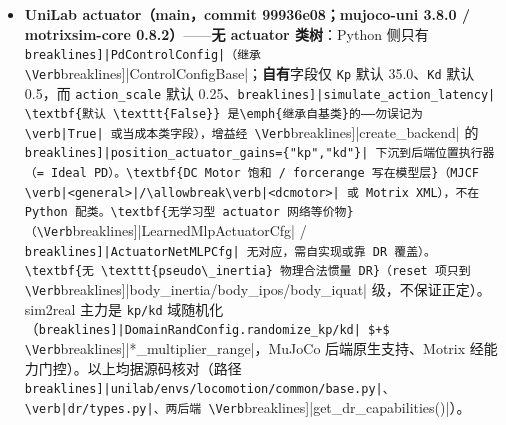 \begin{itemize}
  \item \textbf{UniLab actuator（main，commit 99936e08；mujoco-uni 3.8.0 / motrixsim-core 0.8.2）}——\textbf{无 actuator 类树}：Python 侧只有 \Verb[breaklines]|PdControlConfig|（继承 \Verb[breaklines]|ControlConfigBase|；\textbf{自有}字段仅 \verb|Kp| 默认 35.0、\verb|Kd| 默认 0.5，而 \verb|action_scale| 默认 0.25、\Verb[breaklines]|simulate_action_latency| \textbf{默认 \texttt{False}} 是\emph{继承自基类}的——勿误记为 \verb|True| 或当成本类字段），增益经 \Verb[breaklines]|create_backend| 的 \Verb[breaklines]|position_actuator_gains={"kp","kd"}| 下沉到后端位置执行器（= Ideal PD）。\textbf{DC Motor 饱和 / forcerange 写在模型层}（MJCF \verb|<general>|/\allowbreak\verb|<dcmotor>| 或 Motrix XML），不在 Python 配类。\textbf{无学习型 actuator 网络等价物}（\Verb[breaklines]|LearnedMlpActuatorCfg| / \Verb[breaklines]|ActuatorNetMLPCfg| 无对应，需自实现或靠 DR 覆盖）。\textbf{无 \texttt{pseudo\_inertia} 物理合法惯量 DR}（reset 项只到 \Verb[breaklines]|body_inertia/body_ipos/body_iquat| 级，不保证正定）。sim2real 主力是 \verb|kp/kd| 域随机化（\Verb[breaklines]|DomainRandConfig.randomize_kp/kd| $+$ \Verb[breaklines]|*_multiplier_range|，MuJoCo 后端原生支持、Motrix 经能力门控）。以上均据源码核对（路径 \Verb[breaklines]|unilab/envs/locomotion/common/base.py|、\verb|dr/types.py|、两后端 \Verb[breaklines]|get_dr_capabilities()|）。
\end{itemize}
